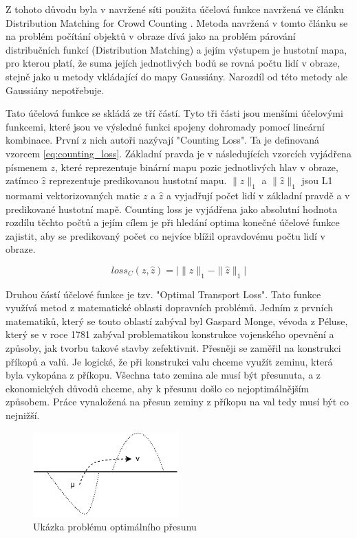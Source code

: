 Z tohoto důvodu byla v navržené síti použita účelová funkce navržená ve článku Distribution Matching for Crowd Counting \cite{DM_Count}.
Metoda navržená v tomto článku se na problém počítání objektů v obraze dívá jako na problém párování distribučních funkcí (Distribution Matching) a jejím výstupem je hustotní mapa, pro kterou platí, že suma jejích jednotlivých bodů se rovná počtu lidí v obraze, stejně jako u metody vkládající do mapy Gaussiány. Narozdíl od této metody ale Gaussiány nepotřebuje.

Tato účelová funkce se skládá ze tří částí.
Tyto tři části jsou menšími účelovými funkcemi, které jsou ve výsledné funkci spojeny dohromady pomocí lineární kombinace.
První z nich autoři nazývají "Counting Loss".
Ta je definovaná vzorcem \ref{eq:counting_loss}.
Základní pravda je v následujících vzorcích vyjádřena písmenem \(z\), které reprezentuje binární mapu pozic jednotlivých hlav v obraze, zatímco \(\hat{z}\) reprezentuje predikovanou hustotní mapu.
\(\|z\|_1\) a \(\|\hat{z}\|_1\) jsou L1 normami vektorizovaných matic \(z\) a \(\hat{z}\) a vyjadřují počet lidí v základní pravdě a v predikované hustotní mapě.
Counting loss je vyjádřena jako absolutní hodnota rozdílu těchto počtů a jejím cílem je při hledání optima konečné účelové funkce zajistit, aby se predikovaný počet co nejvíce blížil opravdovému počtu lidí v obraze.

\begin{equation}
loss_C(z, \hat{z}) = \Big|\|{z}\|_1 - \|\hat{z}\|_1\Big|
\label{eq:counting_loss}
\end{equation}

Druhou částí účelové funkce je tzv. "Optimal Transport Loss". 
Tato funkce využívá metod z matematické oblasti dopravních problémů.
Jedním z prvních matematiků, který se touto oblastí zabýval byl Gaspard Monge, vévoda z Péluse, který se v roce 1781 zabýval problematikou konstrukce vojenského opevnění a způsoby, jak tvorbu takové stavby zefektivnit.
Přesněji se zaměřil na konstrukci příkopů a valů.
Je logické, že při konstrukci valu chceme využít zeminu, která byla vykopána z příkopu.
Všechna tato zemina ale musí být přesunuta, a z ekonomických důvodů chceme, aby k přesunu došlo co nejoptimálnějším způsobem.
Práce vynaložená na přesun zeminy z příkopu na val tedy musí být co nejnižší.

\begin{figure}[h!]
	\centering
	\includegraphics[width=0.5\textwidth]{Figures/solution/Optimal_transport.pdf}
	\caption{Ukázka problému optimálního přesunu}
	\label{fig:RNN_architecture}
\end{figure}



